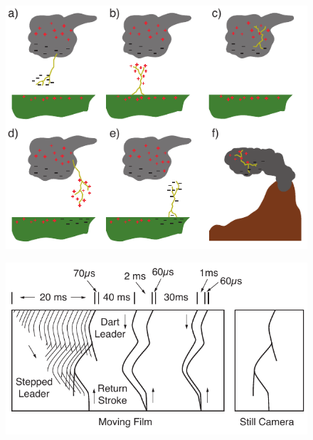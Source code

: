 
\begin{figure}[ht!]
	\centering
	\includegraphics[scale=1]{Introduction/Figures/Lightning_Types.pdf}\\
	\caption{}
	\label{intro:fig:thunderstorm}
\end{figure}


\begin{figure}[ht!]
	\centering
	\includegraphics[scale=1]{Introduction/Figures/Lightning_Evolution.pdf}\\
	\caption{}
	\label{intro:fig:evolution}
\end{figure}

